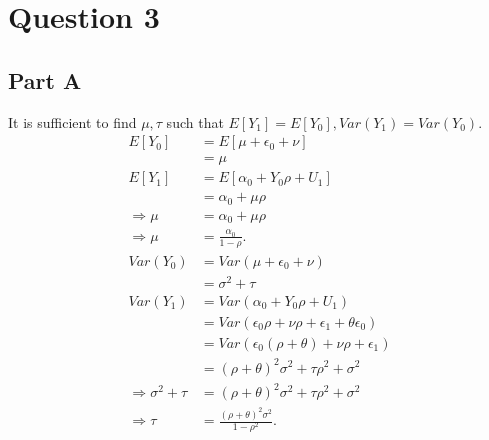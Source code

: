 \documentclass[11pt]{article} %
\begin{document}
\section{Question 3}
\subsection{Part A}
It is sufficient to find $\mu,\tau$ such that $E[Y_1] = E[Y_0], Var(Y_1) = Var(Y_0)$.
\begin{align*}
E[Y_0] &= E[\mu + \epsilon_0 + \nu]\\
&= \mu\\
E[Y_1] &= E[\alpha_0 + Y_0\rho + U_1]\\
&= \alpha_0 + \mu\rho\\
\Rightarrow \mu &= \alpha_0 + \mu\rho\\
\Rightarrow \mu &= \frac{\alpha_0}{1-\rho}.\\
Var(Y_0) &= Var(\mu + \epsilon_0 + \nu)\\
&= \sigma^2 + \tau\\
Var(Y_1)&= Var(\alpha_0 + Y_0\rho + U_1)\\
&= Var(\epsilon_0\rho + \nu\rho + \epsilon_1 + \theta \epsilon_0)\\
&= Var(\epsilon_0(\rho+\theta) + \nu\rho + \epsilon_1)\\
&= (\rho+\theta)^2\sigma^2 + \tau\rho^2 + \sigma^2\\
\Rightarrow \sigma^2 + \tau &=  (\rho+\theta)^2\sigma^2 + \tau\rho^2 + \sigma^2\\
\Rightarrow \tau &= \frac{(\rho + \theta)^2\sigma^2}{1-\rho^2}.
\end{align*}
\end{document}
